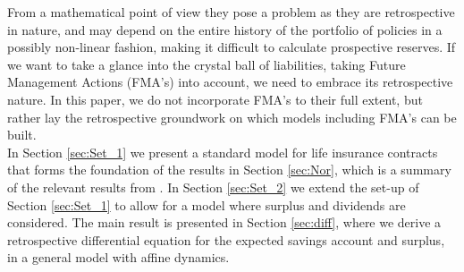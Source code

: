 \documentclass[12pt]{article}
\theoremstyle{my_thm}
\begin{document}
From a mathematical point of view they pose a problem as they are retrospective in nature, and may depend on the entire history of the portfolio of policies in a possibly non-linear fashion, making it difficult to calculate prospective reserves. If we want to take a glance into the crystal ball of liabilities, taking Future Management Actions (FMA's) into account, we need to embrace its retrospective nature. In this paper, we do not incorporate FMA's to their full extent, but rather lay the retrospective groundwork on which models including FMA's can be built.
\\[12pt]
In Section \ref{sec:Set_1} we present a standard model for life insurance contracts that forms the foundation of the results in Section \ref{sec:Nor}, which is a summary of the relevant results from \citet{Norberg}. In Section \ref{sec:Set_2} we extend the set-up of Section \ref{sec:Set_1} to allow for a model where surplus and dividends are considered. The main result is presented in Section \ref{sec:diff}, where we derive a retrospective differential equation for the expected savings account and surplus, in a general model with affine dynamics.
\end{document}
